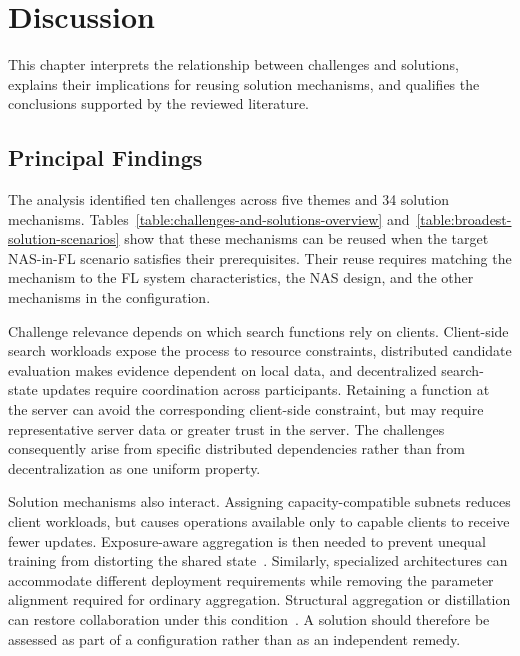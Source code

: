 
\chapter{Discussion}\label{chapter:discussion}

This chapter interprets the relationship between challenges and solutions, explains their implications for reusing solution mechanisms, and qualifies the conclusions supported by the reviewed literature.

\section{Principal Findings}

The analysis identified ten challenges across five themes and 34 solution mechanisms. Tables~\ref{table:challenges-and-solutions-overview} and~\ref{table:broadest-solution-scenarios} show that these mechanisms can be reused when the target NAS-in-FL scenario satisfies their prerequisites. Their reuse requires matching the mechanism to the FL system characteristics, the NAS design, and the other mechanisms in the configuration.

Challenge relevance depends on which search functions rely on clients. Client-side search workloads expose the process to resource constraints, distributed candidate evaluation makes evidence dependent on local data, and decentralized search-state updates require coordination across participants. Retaining a function at the server can avoid the corresponding client-side constraint, but may require representative server data or greater trust in the server. The challenges consequently arise from specific distributed dependencies rather than from decentralization as one uniform property.

Solution mechanisms also interact. Assigning capacity-compatible subnets reduces client workloads, but causes operations available only to capable clients to receive fewer updates. Exposure-aware aggregation is then needed to prevent unequal training from distorting the shared state~\cite{fedoras_2022,fgfl_2024,supernet_trade-off_fednas_2025}. Similarly, specialized architectures can accommodate different deployment requirements while removing the parameter alignment required for ordinary aggregation. Structural aggregation or distillation can restore collaboration under this condition~\cite{multi-granular_fednas_2023,f2nas_2024,hapfnas_2025}. A solution should therefore be assessed as part of a configuration rather than as an independent remedy.

